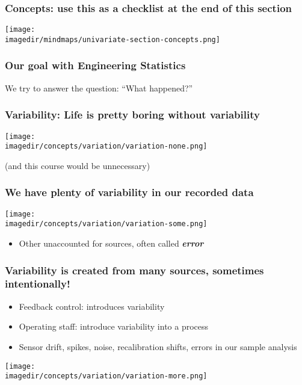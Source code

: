 \begin{frame}\frametitle{Concepts: use this as a checklist at the end of this section}
	\begin{center}
		\texttt{[image: \\imagedir/mindmaps/univariate-section-concepts.png]}
	\end{center}
\end{frame}

\begin{frame}\frametitle{Our goal with Engineering Statistics}
	\begin{exampleblock}{We try to answer the question:}
		``What happened?''
	\end{exampleblock}
\end{frame}

\begin{frame}\frametitle{Variability: Life is pretty boring without variability}

	\begin{center}
		\texttt{[image: \\imagedir/concepts/variation/variation-none.png]}
	\end{center}
	(and this course would be unnecessary)
\end{frame}

\begin{frame}\frametitle{We have plenty of variability in our recorded data}

	\begin{center}
		\texttt{[image: \\imagedir/concepts/variation/variation-some.png]}
	\end{center}
	\begin{itemize}
		\item	Other unaccounted for sources, often called \textbf{\emph{error}}
	\end{itemize}
\end{frame}

\begin{frame}\frametitle{Variability is created from many sources, sometimes intentionally!}
	\begin{itemize}
		\item	Feedback control: introduces variability
		\item	Operating staff: introduce variability into a process
		\item	Sensor drift, spikes, noise, recalibration shifts, errors in our sample analysis
	\end{itemize}

	\texttt{[image: \\imagedir/concepts/variation/variation-more.png]}
\end{frame}

